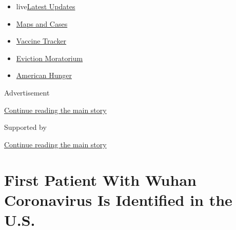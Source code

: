 \begin{itemize}
\tightlist
\item
  live\href{https://www.nytimes3xbfgragh.onion/2020/09/09/world/covid-19-coronavirus.html?name=styln-coronavirus-national\&region=TOP_BANNER\&block=storyline_menu_recirc\&action=click\&pgtype=Article\&impression_id=52372081-f288-11ea-87c3-11143d5ed90a\&variant=undefined}{Latest
  Updates}
\item
  \href{https://www.nytimes3xbfgragh.onion/interactive/2020/us/coronavirus-us-cases.html?name=styln-coronavirus-national\&region=TOP_BANNER\&block=storyline_menu_recirc\&action=click\&pgtype=Article\&impression_id=52372082-f288-11ea-87c3-11143d5ed90a\&variant=undefined}{Maps
  and Cases}
\item
  \href{https://www.nytimes3xbfgragh.onion/interactive/2020/science/coronavirus-vaccine-tracker.html?name=styln-coronavirus-national\&region=TOP_BANNER\&block=storyline_menu_recirc\&action=click\&pgtype=Article\&impression_id=52372083-f288-11ea-87c3-11143d5ed90a\&variant=undefined}{Vaccine
  Tracker}
\item
  \href{https://www.nytimes3xbfgragh.onion/2020/09/02/your-money/eviction-moratorium-covid.html?name=styln-coronavirus-national\&region=TOP_BANNER\&block=storyline_menu_recirc\&action=click\&pgtype=Article\&impression_id=52372084-f288-11ea-87c3-11143d5ed90a\&variant=undefined}{Eviction
  Moratorium}
\item
  \href{https://www.nytimes3xbfgragh.onion/interactive/2020/09/02/magazine/food-insecurity-hunger-us.html?name=styln-coronavirus-national\&region=TOP_BANNER\&block=storyline_menu_recirc\&action=click\&pgtype=Article\&impression_id=52372085-f288-11ea-87c3-11143d5ed90a\&variant=undefined}{American
  Hunger}
\end{itemize}

Advertisement

\protect\hyperlink{after-top}{Continue reading the main story}

Supported by

\protect\hyperlink{after-sponsor}{Continue reading the main story}

\hypertarget{first-patient-with-wuhan-coronavirus-is-identified-in-the-us}{%
\section{First Patient With Wuhan Coronavirus Is Identified in the
U.S.}\label{first-patient-with-wuhan-coronavirus-is-identified-in-the-us}}


